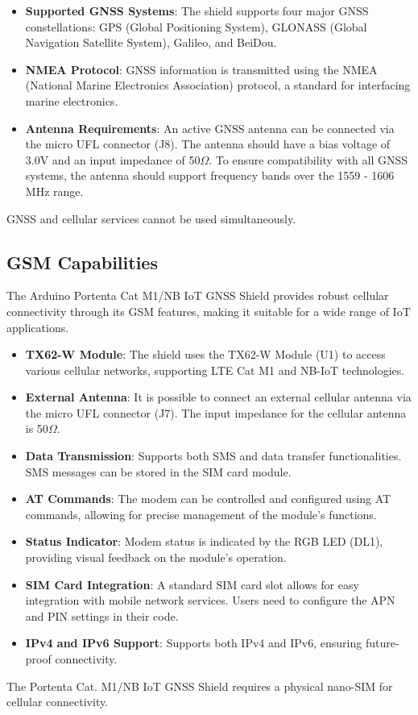 \begin{itemize}
	\item \textbf{Supported GNSS Systems}: The shield supports four major GNSS constellations: GPS (Global Positioning System), GLONASS (Global Navigation Satellite System), Galileo, and BeiDou.
	\item \textbf{NMEA Protocol}: GNSS information is transmitted using the NMEA (National Marine Electronics Association) protocol, a standard for interfacing marine electronics.
	\item \textbf{Antenna Requirements}: An active GNSS antenna can be connected via the micro UFL connector (J8). The antenna should have a bias voltage of 3.0V and an input impedance of 50$\Omega$. To ensure compatibility with all GNSS systems, the antenna should support frequency bands over the 1559 - 1606 MHz range.
\end{itemize}
GNSS and cellular services cannot be used simultaneously. \cite{ArduinoPortenta:2024}

\subsection{GSM Capabilities}

The Arduino Portenta Cat M1/NB IoT GNSS Shield provides robust cellular connectivity through its GSM features, making it suitable for a wide range of IoT applications. \cite{ArduinoPortenta:2024}

\begin{itemize}
	\item \textbf{TX62-W Module}: The shield uses the TX62-W Module (U1) to access various cellular networks, supporting LTE Cat M1 and NB-IoT technologies.
	\item \textbf{External Antenna}: It is possible to connect an external cellular antenna via the micro UFL connector (J7). The input impedance for the cellular antenna is 50$\Omega$.
	\item \textbf{Data Transmission}: Supports both SMS and data transfer functionalities. SMS messages can be stored in the SIM card module.
	\item \textbf{AT Commands}: The modem can be controlled and configured using AT commands, allowing for precise management of the module’s functions.
	\item \textbf{Status Indicator}: Modem status is indicated by the RGB LED (DL1), providing visual feedback on the module’s operation.
	\item \textbf{SIM Card Integration}: A standard SIM card slot allows for easy integration with mobile network services. Users need to configure the APN and PIN settings in their code.
	\item \textbf{IPv4 and IPv6 Support}: Supports both IPv4 and IPv6, ensuring future-proof connectivity.
\end{itemize}
The Portenta Cat. M1/NB IoT GNSS Shield requires a physical nano-SIM for cellular connectivity. \cite{ArduinoPortenta:2024}

